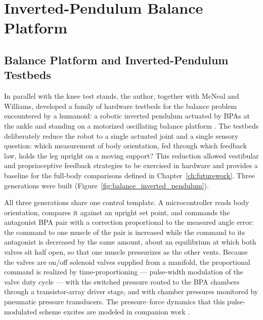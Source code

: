 \chapter{Inverted-Pendulum Balance Platform}\label{ch:ankle}
\graphicspath{{../Figures/40-ankle/}}


\section{Balance Platform and Inverted-Pendulum Testbeds}\label{sec:balance_testbeds}

In parallel with the knee test stands, the author, together with McNeal and Williams, developed a family of hardware testbeds for the balance problem encountered by a humanoid: a robotic inverted pendulum actuated by BPAs at the ankle and standing on a motorized oscillating balance platform \citep{bolen_balance_2024, bolen_selfbalancing_2024, bolen_selfbalancing_srs_2024}. The testbeds deliberately reduce the robot to a single actuated joint and a single sensory question: which measurement of body orientation, fed through which feedback law, holds the leg upright on a moving support? This reduction allowed vestibular and proprioceptive feedback strategies to be exercised in hardware and provides a baseline for the full-body comparisons defined in Chapter~\ref{ch:futurework}. Three generations were built (Figure~\ref{fig:balance_inverted_pendulum}).

All three generations share one control template. A microcontroller reads body orientation, compares it against an upright set point, and commands the antagonist BPA pair with a correction proportional to the measured angle error: the command to one muscle of the pair is increased while the command to its antagonist is decreased by the same amount, about an equilibrium at which both valves sit half open, so that one muscle pressurizes as the other vents. Because the valves are on/off solenoid valves supplied from a manifold, the proportional command is realized by time-proportioning --- pulse-width modulation of the valve duty cycle --- with the switched pressure routed to the BPA chambers through a transistor-array driver stage, and with chamber pressures monitored by pneumatic pressure transducers. The pressure--force dynamics that this pulse-modulated scheme excites are modeled in companion work \citep{elzein_pressure_2025}.

